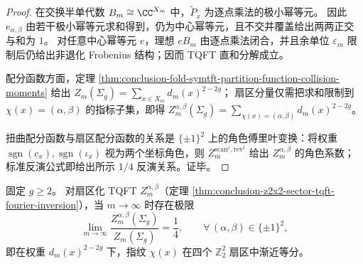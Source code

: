 \begin{proof}
在交换半单代数 \(B_m\cong \CC^{X_m}\) 中，\(\widetilde P_x\) 为逐点乘法的极小幂等元。
因此 \(e_{\alpha,\beta}\) 由若干极小幂等元求和得到，仍为中心幂等元，且不交并覆盖给出两两正交与和为 \(1\)。
对任意中心幂等元 \(e\)，理想 \(eB_m\) 由逐点乘法闭合，并且余单位 \(\varepsilon_m\) 限制后仍给出非退化 Frobenius 结构；因而 TQFT 直和分解成立。
\par
配分函数方面，定理 \ref{thm:conclusion-fold-symtft-partition-function-collision-moments} 给出
\(
Z_m(\Sigma_g)=\sum_{x\in X_m}d_m(x)^{2-2g}
\)；
扇区分量仅需把求和限制到 \(\chi(x)=(\alpha,\beta)\) 的指标子集，即得
\(
Z_m^{\alpha,\beta}(\Sigma_g)=\sum_{\chi(x)=(\alpha,\beta)}d_m(x)^{2-2g}
\)。
\par
扭曲配分函数与扇区配分函数的关系是 \(\{\pm1\}^2\) 上的角色傅里叶变换：将权重 \(\operatorname{sgn}(c_x),\operatorname{sgn}(\iota_x)\) 视为两个坐标角色，则 \(Z_m^{\mathrm{scan}^s,\mathrm{rev}^t}\) 给出 \(Z_m^{\alpha,\beta}\) 的角色系数；标准反演公式即给出所示 \(1/4\) 反演关系。证毕。
\end{proof}

\begin{conjecture}[扇区化配分函数的加权等分律]\label{conj:conclusion-z2x2-sector-tqft-weighted-equidistribution}
固定 \(g\ge 2\)。
对扇区化 TQFT \(Z_m^{\alpha,\beta}\)（定理 \ref{thm:conclusion-z2x2-sector-tqft-fourier-inversion}），当 \(m\to\infty\) 时存在极限
\[
\lim_{m\to\infty}\frac{Z_m^{\alpha,\beta}(\Sigma_g)}{Z_m(\Sigma_g)}=\frac14,
\qquad
\forall\,(\alpha,\beta)\in\{\pm1\}^2,
\]
即在权重 \(d_m(x)^{2-2g}\) 下，指纹 \(\chi(x)\) 在四个 \(\mathbb Z_2^2\) 扇区中渐近等分。
\end{conjecture}

